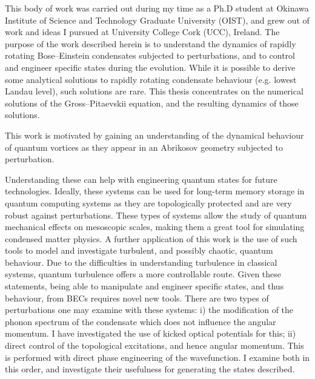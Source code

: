 
This body of work was carried out during my time as a Ph.D student at Okinawa Institute of Science and Technology Graduate University (OIST), and grew out of work and ideas I pursued at University College Cork (UCC), Ireland. The purpose of the work described herein is to understand the dynamics of rapidly rotating Bose--Einstein condensates subjected to perturbations, and to control and engineer specific states during the evolution. While it is possible to derive some analytical solutions to rapidly rotating condensate behaviour (e.g. lowest Landau level), such solutions are rare. This thesis concentrates on the numerical solutions of the Gross--Pitaevskii equation, and the resulting dynamics of those solutions.


This work is motivated by gaining an understanding of the dynamical behaviour of quantum vortices as they appear in an Abrikosov geometry subjected to perturbation. %

 Understanding these can help with engineering quantum states for future technologies. Ideally, these systems can be used for long-term memory storage in quantum computing systems as they are topologically protected and are very robust against perturbations. These types of systems allow the study of quantum mechanical effects on mesoscopic scales, making them a great tool for simulating condensed matter physics. A further application of this work is the use of such tools to model and investigate turbulent, and possibly chaotic, quantum behaviour. Due to the difficulties in understanding turbulence in classical systems, quantum turbulence offers a more controllable route. Given these statements, being able to manipulate and engineer specific states, and thus behaviour, from BECs requires novel new tools. There are two types of perturbations one may examine with these systems: i) the modification of the phonon spectrum of the condensate which does not influence the angular momentum. I have investigated the use of kicked optical potentials for this; ii) direct control of the topological excitations, and hence angular momentum. This is performed with direct phase engineering of the wavefunction. I examine both in this order, and investigate their usefulness for generating the states described.

